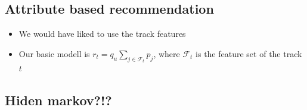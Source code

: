 \subsection{Attribute based recommendation}
\begin{itemize}
\item We would have liked to use the track features
\item Our basic modell is $r_t = q_u \sum_{j\in\mathcal{F}_t}p_j$,
  where $\mathcal{F}_t$ is the feature set of the track $t$
\end{itemize}

\subsection{Hiden markov?!?}
